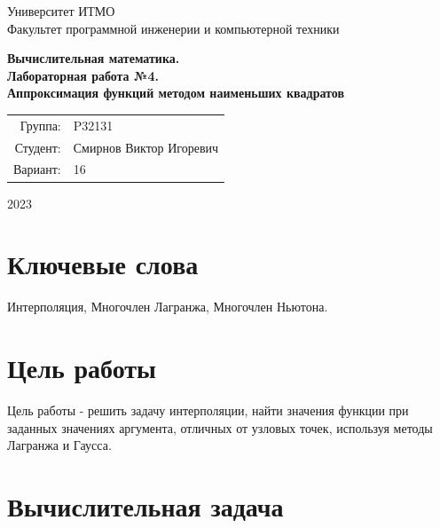 \documentclass{article}
\begin{document}
\begin{titlepage}
    \begin{center}
        \begin{spacing}{1.4}
            \large{Университет ИТМО} \\
            \large{Факультет программной инженерии и компьютерной техники} \\
        \end{spacing}
        \vfill
        \textbf{
            \huge{Вычислительная математика.} \\
            \huge{Лабораторная работа №4.} \\
            \huge{Аппроксимация функций методом наименьших квадратов} \\
        }
    \end{center}
    \vfill
    \begin{center}
        \begin{tabular}{r l}
            Группа:  & P32131                  \\
            Студент: & Смирнов Виктор Игоревич \\
            Вариант: & 16                      \\
        \end{tabular}
    \end{center}
    \vfill
    \begin{center}
        \begin{large}
            2023
        \end{large}
    \end{center}
\end{titlepage}

\section*{Ключевые слова}
Интерполяция, Многочлен Лагранжа, Многочлен Ньютона.

\section{Цель работы}

Цель работы - решить задачу интерполяции, найти значения функции
при заданных значениях аргумента, отличных от узловых точек,
используя методы Лагранжа и Гаусса.

\section{Вычислительная задача}
\end{document}
